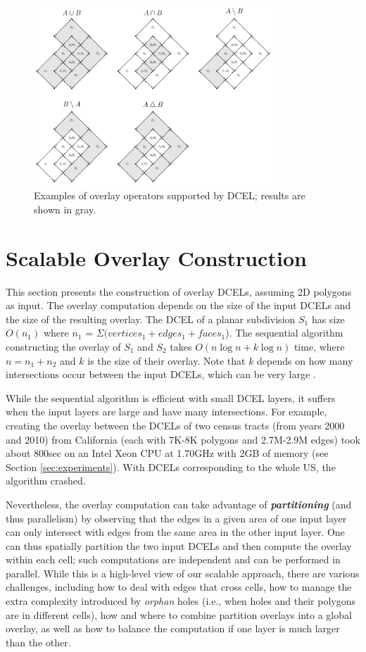 \begin{figure}
    \centering
    \includegraphics[width=0.8\textwidth]{chapterSDCEL/dcel_operators.pdf}
    \caption{Examples of overlay operators supported by DCEL; results are shown in gray.}
    \label{fig:dcel_operators}
\end{figure}

\section{Scalable Overlay Construction}\label{sec:methods}
This section presents the construction of overlay DCELs, assuming 2D polygons as input. The overlay computation depends on the size of the input DCELs and the size of the resulting overlay. The DCEL of a planar subdivision $S_1$ has size $O(n_1)$ where $n_1$ = $\Sigma (vertices_1 + edges_1 + faces_1$).  The sequential algorithm constructing the overlay of $S_1$ and $S_2$ takes $O(n \log n + k \log n)$ time, where $n = n_1 + n_2$ and $k$ is the size of their overlay.  Note that $k$ depends on how many intersections occur between the input DCELs, which can be very large \cite{berg_computational_2008}.

While the sequential algorithm is efficient with small DCEL layers, it suffers when the input layers are large and have many intersections. For example, creating the overlay between the DCELs of two census tracts (from years 2000 and 2010) from California (each with 7K-8K polygons and 2.7M-2.9M edges) took about 800sec on an Intel Xeon CPU at 1.70GHz  with 2GB of memory (see Section \ref{sec:experiments}). With DCELs corresponding to the whole US, the algorithm crashed.

Nevertheless, the overlay computation can take advantage of \textit{\textbf{partitioning}} (and thus parallelism) by observing that the edges in a given area of one input layer can only intersect with edges from the same area in the other input layer. One can thus spatially partition the two input DCELs and then compute the overlay within each cell; such computations are independent and can be performed in parallel. While this is a high-level view of our scalable approach, there are various challenges, including how to deal with edges that cross cells, how to manage the extra complexity introduced by \textit{orphan} holes (i.e., when holes and their polygons are in different cells), how and where to combine partition overlays into a global overlay, as well as how to balance the computation if one layer is much larger than the other.

